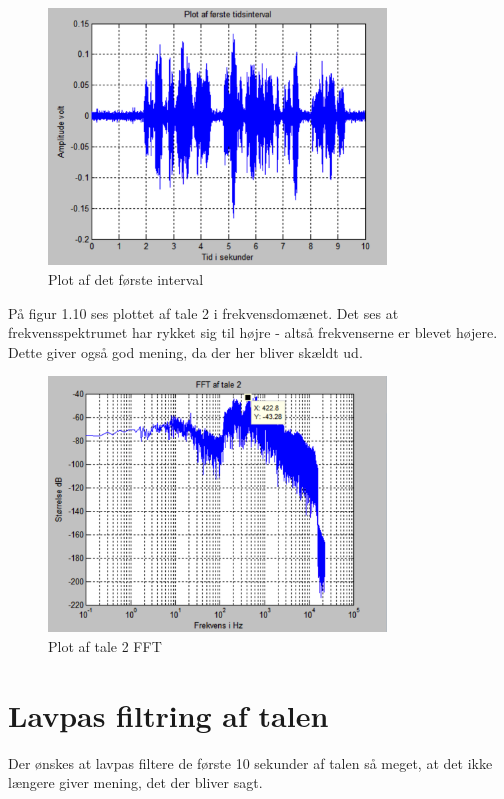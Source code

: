 \begin{figure}[H]
	\centering
	\includegraphics[width=0.8\textwidth]{Figur/Snip20151201_16}
	\caption{Plot af det første interval}
\end{figure}

På figur 1.10 ses plottet af tale 2 i frekvensdomænet. Det ses at frekvensspektrumet har rykket sig til højre - altså frekvenserne er blevet højere. Dette giver også god mening, da der her bliver skældt ud. 

\begin{figure}[H]
	\centering
	\includegraphics[width=0.8\textwidth]{Figur/Snip20151201_14}
	\caption{Plot af tale 2 FFT}
\end{figure}


\section{Lavpas filtring af talen}
Der ønskes at lavpas filtere de første 10 sekunder af talen så meget, at det ikke længere giver mening, det der bliver sagt. 

